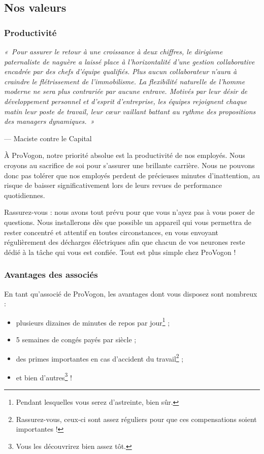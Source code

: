 \subsection{Nos valeurs}

\subsubsection{Productivité}

\emph{« Pour assurer le retour à une croissance à deux chiffres, le dirigisme
paternaliste de naguère a laissé place à l'horizontalité d'une gestion
collaborative encadrée par des chefs d'équipe qualifiés. Plus aucun
collaborateur n'aura à craindre le flétrissement de l'immobilisme. La
flexibilité naturelle de l'homme moderne ne sera plus contrariée par aucune
entrave. Motivés par leur désir de développement personnel et d'esprit
d'entreprise, les équipes rejoignent chaque matin leur poste de travail, leur
cœur vaillant battant au rythme des propositions des managers dynamiques. »}

\vspace{0.3cm}
\hspace{3cm} --- Maciste contre le Capital

À ProVogon, notre priorité absolue est la productivité de nos employés. Nous
croyons au sacrifice de soi pour s'assurer une brillante carrière. Nous ne
pouvons donc pas tolérer que nos employés perdent de précieuses minutes
d'inattention, au risque de baisser significativement lors de leurs revues de
performance quotidiennes.

Rassurez-vous : nous avons tout prévu pour que vous n'ayez pas à vous poser de
questions. Nous installerons dès que possible un appareil qui vous permettra
de rester concentré et attentif en toutes circonstances, en vous envoyant
régulièrement des décharges éléctriques afin que chacun de vos neurones reste
dédié à la tâche qui vous est confiée. Tout est plus simple chez ProVogon !

\subsubsection{Avantages des associés}

En tant qu'associé de ProVogon, les avantages dont vous disposez sont nombreux :

\begin{itemize}
    \item plusieurs dizaines de minutes de repos par jour\footnote{Pendant
        lesquelles vous serez d'astreinte, bien sûr.} ;
    \item 5 semaines de congés payés par siècle ;
    \item des primes importantes en cas d'accident du
        travail\footnote{Rassurez-vous, ceux-ci sont assez réguliers pour
        que ces compensations soient importantes !} ;
    \item et bien d'autres\footnote{Vous les découvrirez bien assez tôt.} !
\end{itemize}


